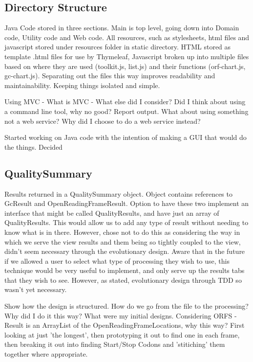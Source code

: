 \subsection{Directory Structure}
Java Code stored in three sections. Main is top level, going down into Domain code, Utility code and Web code. All resources, such as stylesheets, html files and javascript stored under resources folder in static directory. HTML stored as template .html files for use by Thymeleaf, Javascript broken up into multiple files based on where they are used (toolkit.js, list.js) and their functions (orf-chart.js, gc-chart.js). Separating out the files this way improves readability and maintainability. Keeping things isolated and simple.

Using MVC - What is MVC - What else did I consider? Did I think about using a command line tool, why no good? Report output. What about using something not a web service? Why did I choose to do a web service instead?

Started working on Java code with the intention of making a GUI that would do the things. Decided


\subsection{QualitySummary}
Results returned in a QualitySummary object. Object contains references to GcResult and OpenReadingFrameResult. Option to have these two implement an interface that might be called QualityResults, and have just an array of QualityResults. This would allow us to add any type of result without needing to know what is in there. However, chose not to do this as considering the way in which we serve the view results and them being so tightly coupled to the view, didn't seem necessary through the evolutionary design. Aware that in the future if we allowed a user to select what type of processing they wish to use, this technique would be very useful to implement, and only serve up the results tabs that they wish to see. However, as stated, evolutionary design through TDD so wasn't yet necessary.

Show how the design is structured. How do we go from the file to the processing? Why did I do it this way? What were my initial designs.
Considering ORFS - Result is an ArrayList of the OpenReadingFrameLocations, why this way? First looking at just 'the longest', then prototyping it out to find one in each frame, then breaking it out into finding Start/Stop Codons and 'stitiching' them together where appropriate.

